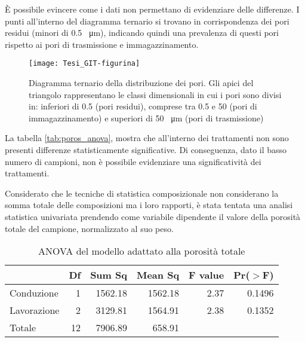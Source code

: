 \documentclass[a4paper]{article}
\begin{document}
\`E possibile evincere come i dati non permettano di evidenziare delle
differenze. I punti all'interno del diagramma ternario si trovano in
corrispondenza dei pori residui (minori di 0.5 \SI{}{\micro\metre}),
indicando quindi una prevalenza di questi pori rispetto ai pori di
trasmissione e immagazzinamento.

 
\begin{figure}[ht]
  \centering
\texttt{[image: Tesi\_GIT-figurina]}
\caption[didascalia corta]{Diagramma ternario della distribuzione dei
  pori. Gli apici del triangolo rappresentano le classi dimensionali
  in cui i pori sono divisi in: inferiori di 0.5 (pori residui),
  comprese tra 0.5 e 50 (pori di immagazzinamento) e superiori di 50
  \SI{}{\micro\metre} (pori di trasmissione)}
  \label{fig:Poros_triangolo}
\end{figure}
\FloatBarrier

La tabella \ref{tab:poros_anova}, mostra che all'interno dei
trattamenti non sono presenti differenze statisticamente
significative. Di conseguenza, dato il basso numero di campioni, non
\`e possibile evidenziare una significatività dei trattamenti.

Considerato che le tecniche di statistica composizionale non
considerano la somma totale delle composizioni ma i loro rapporti, \`e
stata tentata una analisi statistica univariata prendendo come
variabile dipendente il valore della porosità totale del campione,
normalizzato al suo peso.


\begin{table}[ht]
\centering
\caption{ANOVA del modello adattato alla porosità totale} 
\label{tab:tot_anova}
\begin{tabular}{lrrrrr}

  \hline
 & Df & Sum Sq & Mean Sq & F value & Pr($>$F) \\ 
  \hline
Conduzione & 1 & 1562.18 & 1562.18 & 2.37 & 0.1496 \\ 
  Lavorazione & 2 & 3129.81 & 1564.91 & 2.38 & 0.1352 \\ 
  Totale & 12 & 7906.89 & 658.91 &  &  \\ 
   \hline
\end{tabular}
\end{table}
\end{document}
